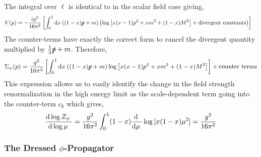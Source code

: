 \documentclass[12pt]{article}
\begin{document}
The integral over $\ell$ is identical to in the scalar field case giving,
\begin{align*}
V(p) & = - \frac{ig^2}{16 \pi^2} \left[ \int_0^1 \mathrm{d}x \: ((1 - x) \slashed{p} + m) \left( \log{\left[ x(x - 1) p^2  + x m^2 + (1 - x) M^2 \right] } + \text{divergent constants} \right) \right] 
\end{align*}
The counter-terms have exactly the correct form to cancel the divergent quantity multiplied by $\tfrac{1}{2} \slashed{p} + m$. Therefore,
\[ \Sigma_\psi(p) = \frac{g^2}{16 \pi^2} \left[ \int_0^1 \mathrm{d}x \: ((1 - x) \slashed{p} + m)  \log{\left[ x(x - 1) p^2  + x m^2 + (1 - x) M^2 \right] }  \right] + \text{counter terms} \]
This expression allows us to easily identify the change in the field strength renormalization in the high energy limit as the scale-dependent term going into the counter-term $c_6$ which gives,
\[ \frac{\mathrm{d}\log{Z_{\psi}} \:}{\mathrm{d}\log{\mu} \:} = \frac{g^2}{16 \pi^2} \int_0^1 (1 - x) \frac{\mathrm{d} \:}{\mathrm{d}\mu \:} \log{[x(1-x) \mu^2]} =  \frac{g^2}{16 \pi^2} \]

\subsubsection{The Dressed $\phi$-Propagator}
\end{document}
